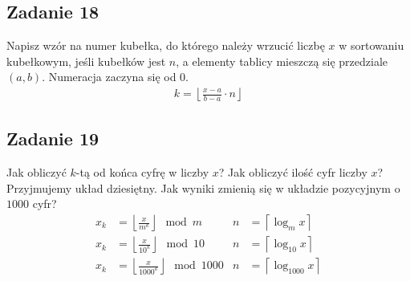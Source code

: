 \documentclass{article}
\begin{document}
\subsection*{Zadanie 18}
Napisz wzór na numer kubełka, do którego należy wrzucić liczbę $x$ w sortowaniu
kubełkowym, jeśli kubełków jest $n$, a elementy tablicy mieszczą się przedziale $(a, b)$.
Numeracja zaczyna się od $0$.
\begin{gather*}
    k = \left \lfloor \frac{x - a}{b - a} \cdot n \right \rfloor
\end{gather*}

\subsection*{Zadanie 19}
Jak obliczyć $k$-tą od końca cyfrę w liczby $x$? Jak obliczyć ilość cyfr liczby $x$?
Przyjmujemy układ dziesiętny. Jak wyniki zmienią się w układzie pozycyjnym o $1000$ cyfr?
\begin{align*}
    x_k & = \left \lfloor \frac{x}{m^k} \right \rfloor \mod m       & n & = \left \lceil \log_m x \right \rceil      \\
    x_k & = \left \lfloor \frac{x}{10^k} \right \rfloor \mod 10     & n & = \left \lceil \log_{10} x \right \rceil   \\
    x_k & = \left \lfloor \frac{x}{1000^k} \right \rfloor \mod 1000 & n & = \left \lceil \log_{1000} x \right \rceil
\end{align*}
\end{document}
